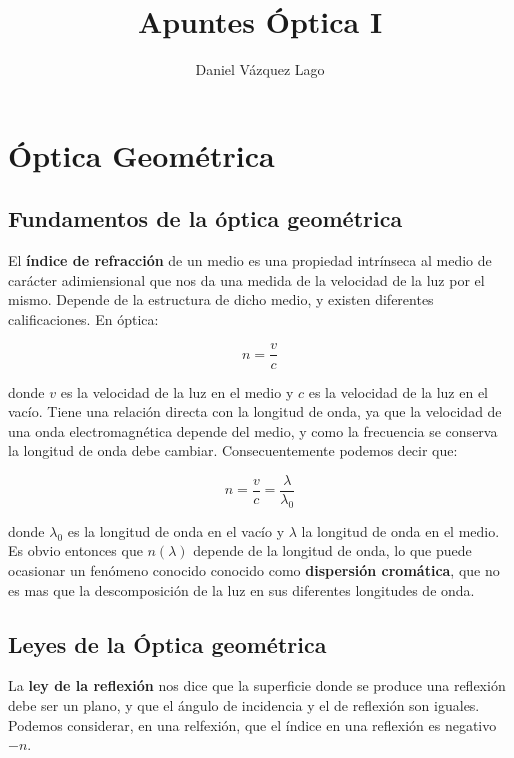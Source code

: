 \documentclass[12pt,a4paper]{article}
\author{Daniel Vázquez Lago}
\title{Apuntes Óptica I}
\numberwithin{equation}{section}
\numberwithin{figure}{section}
\begin{document}
\maketitle

\newpage

\tableofcontents

\newpage

\section{Óptica Geométrica}

\subsection{Fundamentos de la óptica geométrica}

El \textbf{índice de refracción} de un medio es una propiedad intrínseca al medio de carácter adimiensional que nos da una medida de la velocidad de la luz por el mismo. Depende de la estructura de dicho medio, y existen diferentes calificaciones. En óptica:

\begin{equation}
n = \frac{v}{c}
\end{equation}

donde $v$ es la velocidad de la luz en el medio y $c$ es la velocidad de la luz en el vacío. Tiene una relación directa con la longitud de onda, ya que la velocidad de una onda electromagnética depende del medio, y como la frecuencia se conserva la longitud de onda debe cambiar. Consecuentemente podemos decir que:

\begin{equation}
n = \frac{v}{c} = \frac{\lambda}{\lambda_0}
\end{equation}

donde $\lambda_0$ es la longitud de onda en el vacío y $\lambda$ la longitud de onda en el medio. Es obvio entonces que $n(\lambda)$ depende de la longitud de onda, lo que puede ocasionar un fenómeno conocido conocido como \textbf{dispersión cromática}, que no es mas que la descomposición de la luz en sus diferentes longitudes de onda. 

\subsection{Leyes de la Óptica geométrica}

La \textbf{ley de la reflexión} nos dice que la superficie donde se produce una reflexión debe ser un plano, y que el ángulo de incidencia y el de reflexión son iguales. Podemos considerar, en una relfexión, que el índice en una reflexión es negativo $-n$. \\
\end{document}
